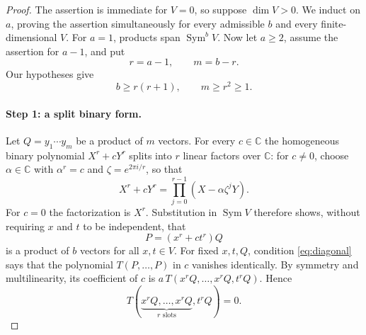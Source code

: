 \documentclass[11pt]{article}
\theoremstyle{remark}
\DeclareMathOperator{\Sym}{Sym}
\newcommand{\C}{\mathbb C}
\begin{document}
\begin{proof}
The assertion is immediate for $V=0$, so suppose $\dim V>0$.
We induct on $a$, proving the assertion simultaneously for every admissible
$b$ and every finite-dimensional $V$. For $a=1$, products span $\Sym^b V$.
Now let $a\ge2$, assume the assertion for $a-1$, and put
\begin{equation}\label{eq:rm}
 r=a-1,\qquad m=b-r.
\end{equation}
Our hypotheses give
\begin{equation}\label{eq:range}
 b\ge r(r+1),\qquad m\ge r^2\ge1.
\end{equation}

\paragraph{Step 1: a split binary form.}
Let $Q=y_1\cdots y_m$ be a product of $m$ vectors. For every $c\in\C$
the homogeneous binary polynomial $X^r+cY^r$ splits into $r$ linear
factors over $\C$: for $c\ne0$, choose $\alpha\in\C$ with $\alpha^r=c$ and
$\zeta=e^{2\pi i/r}$, so that
\[
 X^r+cY^r=\prod_{j=0}^{r-1}(X-\alpha\zeta^jY).
\]
For $c=0$ the factorization is $X^r$. Substitution in $\Sym V$ therefore
shows, without requiring $x$ and $t$ to be independent, that
\[
 P=(x^r+ct^r)Q
\]
is a product of $b$ vectors for all $x,t\in V$. For fixed $x,t,Q$,
condition \eqref{eq:diagonal} says that the polynomial $T(P,\ldots,P)$
in $c$ vanishes identically. By symmetry and multilinearity, its
coefficient of $c$ is
$a\,T(x^rQ,\ldots,x^rQ,t^rQ)$. Hence
\begin{equation}\label{eq:binary}
 T(\underbrace{x^rQ,\ldots,x^rQ}_{r\text{ slots}},t^rQ)=0.
\end{equation}


\end{proof}
\end{document}
